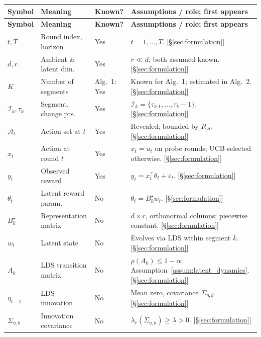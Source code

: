 \documentclass{article}
\newcommand{\cA}{\mathcal{A}}
\newcommand{\cI}{\mathcal{I}}
\begin{document}
\begin{longtable}
{@{}p{} p{} p{} p{}@{}}
\toprule

\textbf{Symbol} & \textbf{Meaning} & \textbf{Known?} & \textbf{Assumptions / role; first appears} \\
\midrule
\endfirsthead
\toprule
\textbf{Symbol} & \textbf{Meaning} & \textbf{Known?} & \textbf{Assumptions / role; first appears} \\
\midrule
\endhead
\bottomrule
\endfoot
$t, T$ & Round index, horizon & Yes & $t=1,\dots,T$. [\S\ref{sec:formulation}] \\
$d, r$ & Ambient \& latent dim. & Yes & $r\ll d$; both assumed known. [\S\ref{sec:formulation}] \\
$K$ & Number of segments & Alg.~1: Yes & Known for Alg.~1; estimated in Alg.~2. [\S\ref{sec:formulation}] \\
$\cI_k, \tau_k$ & Segment, change pts. & Yes & $\cI_k = \{\tau_{k\text{-}1},\dots,\tau_k{-}1\}$. [\S\ref{sec:formulation}] \\
$\cA_t$ & Action set at $t$ & Yes & Revealed; bounded by $R_{\cA}$. [\S\ref{sec:formulation}] \\
$x_t$ & Action at round $t$ & Yes & $x_t = u_t$ on probe rounds; UCB-selected otherwise. [\S\ref{sec:formulation}] \\
$y_t$ & Observed reward & Yes & $y_t = x_t^\top\theta_t+\varepsilon_t$. [\S\ref{sec:formulation}] \\
$\theta_t$ & Latent reward param. & No & $\theta_t = B_k^\star w_t$. [\S\ref{sec:formulation}] \\
$B_k^\star$ & Representation matrix & No & $d{\times}r$, orthonormal columns; piecewise constant. [\S\ref{sec:formulation}] \\
$w_t$ & Latent state & No & Evolves via LDS within segment $k$. [\S\ref{sec:formulation}] \\
$A_k$ & LDS transition matrix & No & $\rho(A_k)\le 1{-}\alpha$; Assumption~\ref{assum:latent_dynamics}. [\S\ref{sec:formulation}] \\
$\eta_{t-1}$ & LDS innovation & No & Mean zero, covariance $\Sigma_{\eta,k}$. [\S\ref{sec:formulation}] \\
$\Sigma_{\eta,k}$ & Innovation covariance & No & $\lambda_r(\Sigma_{\eta,k}) \ge \underline{\lambda} > 0$. [\S\ref{sec:formulation}] \\

\end{longtable}
\end{document}
